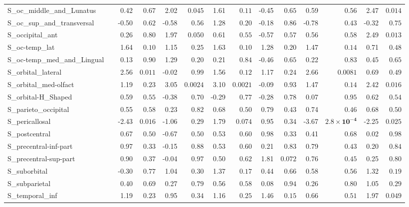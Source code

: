 {\begin{longtable}{llrrrrrrrrrrrr}
S\_oc\_middle\_and\_Lunatus &  & 0.42 & $0.67$ & 2.02 & $0.045$ & 1.61 & $0.11$ & -0.45 & $0.65$ & 0.59 & $0.56$ & 2.47 & $0.014$ \\
S\_oc\_sup\_and\_transversal &  & -0.50 & $0.62$ & -0.58 & $0.56$ & 1.28 & $0.20$ & -0.18 & $0.86$ & -0.78 & $0.43$ & -0.32 & $0.75$ \\
S\_occipital\_ant &  & 0.26 & $0.80$ & 1.97 & $0.050$ & 0.61 & $0.55$ & -0.57 & $0.57$ & 0.56 & $0.58$ & 2.49 & $0.013$ \\
S\_oc-temp\_lat &  & 1.64 & $0.10$ & 1.15 & $0.25$ & 1.63 & $0.10$ & 1.28 & $0.20$ & 1.47 & $0.14$ & 0.71 & $0.48$ \\
S\_oc-temp\_med\_and\_Lingual &  & 0.13 & $0.90$ & 1.29 & $0.20$ & 0.21 & $0.84$ & -0.46 & $0.65$ & 0.22 & $0.83$ & 0.45 & $0.65$ \\
S\_orbital\_lateral &  & 2.56 & $0.011$ & -0.02 & $0.99$ & 1.56 & $0.12$ & 1.17 & $0.24$ & 2.66 & $0.0081$ & 0.69 & $0.49$ \\
S\_orbital\_med-olfact &  & 1.19 & $0.23$ & 3.05 & $0.0024$ & 3.10 & $0.0021$ & -0.09 & $0.93$ & 1.47 & $0.14$ & 2.42 & $0.016$ \\
S\_orbital-H\_Shaped &  & 0.59 & $0.55$ & -0.38 & $0.70$ & -0.29 & $0.77$ & -0.28 & $0.78$ & 0.07 & $0.95$ & 0.62 & $0.54$ \\
S\_parieto\_occipital &  & 0.55 & $0.58$ & 0.23 & $0.82$ & 0.68 & $0.50$ & 0.79 & $0.43$ & 0.74 & $0.46$ & 0.68 & $0.50$ \\
S\_pericallosal &  & -2.43 & $0.016$ & -1.06 & $0.29$ & 1.79 & $0.074$ & 0.95 & $0.34$ & -3.67 & $\mathbf{2.8{\times}10^{-4}}$ & -2.25 & $0.025$ \\
S\_postcentral &  & 0.67 & $0.50$ & -0.67 & $0.50$ & 0.53 & $0.60$ & 0.98 & $0.33$ & 0.41 & $0.68$ & 0.02 & $0.98$ \\
S\_precentral-inf-part &  & 0.97 & $0.33$ & -0.15 & $0.88$ & 0.53 & $0.60$ & 0.21 & $0.83$ & 0.79 & $0.43$ & 0.20 & $0.84$ \\
S\_precentral-sup-part &  & 0.90 & $0.37$ & -0.04 & $0.97$ & 0.50 & $0.62$ & 1.81 & $0.072$ & 0.76 & $0.45$ & 0.25 & $0.80$ \\
S\_suborbital &  & -0.30 & $0.77$ & 1.04 & $0.30$ & 1.37 & $0.17$ & 0.44 & $0.66$ & 0.58 & $0.56$ & 1.32 & $0.19$ \\
S\_subparietal &  & 0.40 & $0.69$ & 0.27 & $0.79$ & 0.56 & $0.58$ & 0.08 & $0.94$ & 0.26 & $0.80$ & 1.05 & $0.29$ \\
S\_temporal\_inf &  & 1.19 & $0.23$ & 0.95 & $0.34$ & 1.16 & $0.25$ & 1.46 & $0.15$ & 0.66 & $0.51$ & 1.97 & $0.049$ \\

\end{longtable}}
